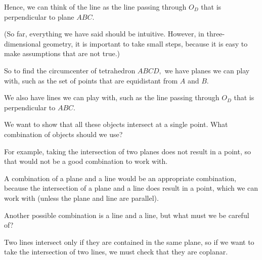 Hence, we can think of the line as the line passing through $O_D$ that is perpendicular to plane $ABC$.

(So far, everything we have said should be intuitive. However, in three-dimensional geometry, it is important to take small steps, because it is easy to make assumptions that are not true.)

So to find the circumcenter of tetrahedron $ABCD,$ we have planes we can play with, such as the set of points that are equidistant from $A$ and $B.$

We also have lines we can play with, such as the line passing through $O_D$ that is perpendicular to $ABC.$

We want to show that all these objects intersect at a single point. What combination of objects should we use?

For example, taking the intersection of two planes does not result in a point, so that would not be a good combination to work with.




A combination of a plane and a line would be an appropriate combination, because the intersection of a plane and a line does result in a point, which we can work with (unless the plane and line are parallel).



Another possible combination is a line and a line, but what must we be careful of?


Two lines intersect only if they are contained in the same plane, so if we want to take the intersection of two lines, we must check that they are coplanar.

